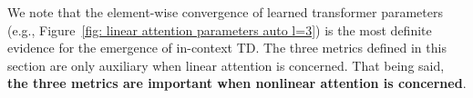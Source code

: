 \documentclass{article}
\newcommand{\E}{\mathbb{E}}
\newcommand{\tb}[1]{{\textbf{#1}}}
\newcommand{\indot}[2]{{\left<#1, #2\right>}}
\newcommand{\tf}{\text{TF}}
\newcommand{\td}{\text{TD}}
\begin{document}
We note that the element-wise convergence of learned transformer parameters (e.g., Figure~\ref{fig: linear attention parameters auto l=3}) is the most definite evidence for the emergence of in-context TD.
The three metrics defined in this section are only auxiliary when linear attention is concerned.
That being said,
\tb{the three metrics are important when nonlinear attention is concerned}.

\end{document}
